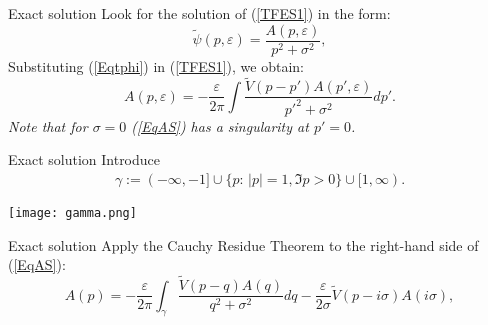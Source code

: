 \documentclass{beamer}
\begin{document}

\begin{frame}{Exact solution}
Look for the solution of (\ref{TFES1}) in the form:
\begin{equation}\label{Eqtphi}
\tilde{\psi}(p,\varepsilon)=\frac{A(p,\varepsilon)}{p^2+\sigma^2},
\end{equation}
Substituting (\ref{Eqtphi}) in (\ref{TFES1}), we obtain:
\begin{equation}\label{EqAS}
A(p,\varepsilon)=-\frac{\varepsilon}{2\pi}\int \frac{\tilde{V}(p-p')A(p',\varepsilon)}{p'^2+\sigma^2}dp'.
\end{equation}
\emph{Note that for $\sigma=0$ (\ref{EqAS}) has a singularity at $p'=0$.}
\end{frame}


\begin{frame}{Exact solution}
Introduce
\begin{align}\label{ECG}\gamma:=(-\infty,-1] \cup \{p:\,|p|=1, \Im p>0\} \cup[1,\infty).\end{align}

\centerline{\texttt{[image: gamma.png]}}

\end{frame}

\begin{frame}{Exact solution}
Apply the Cauchy Residue Theorem  to the right-hand side of (\ref{EqAS}):
\begin{equation}\label{EqAS1}
A(p)=-\frac{\varepsilon}{2\pi}\int_\gamma \frac{\tilde{V}(p-q)A(q)}{q^2+\sigma^2}dq-\frac{\varepsilon}{2\sigma} \tilde{V}(p-i\sigma)A(i\sigma),
\end{equation}
\end{frame}
\end{document}
